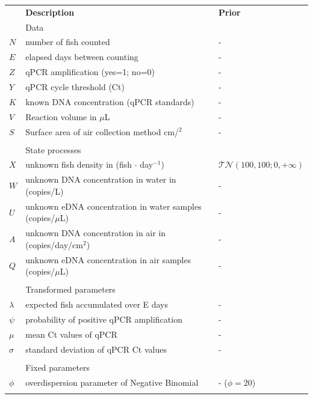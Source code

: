 \documentclass{article}
\begin{document}
\clearpage
\begin{table}
    \centering
    \begin{tabular}{lll}
         & \textbf{Description} & \textbf{Prior} \\
&Data & \\
\hline
$N$ & number of fish counted & - \\
$E$ & elapsed days between counting & - \\
$Z$ & qPCR amplification (yes=1; no=0) & - \\
$Y$ & qPCR cycle threshold (Ct) & - \\
$K$ & known DNA concentration (qPCR standards) & - \\
$V$ & Reaction volume in $\mu$L & - \\
$S$ & Surface area of air collection method cm/$^2$ & - \\

&&\\
&State processes&\\
\hline
$X$ & unknown fish density in (fish $\cdot$ day$^{-1}$) & $\mathcal{TN}(100,100;0,+\infty)$ \\
$W$ & unknown DNA concentration in water in (copies/L) & - \\
$U$&unknown eDNA concentration in water samples (copies/$\mu$L) & - \\
$A$ & unknown DNA concentration in air in (copies/day/cm$^2$) & - \\
$Q$ & unknown eDNA concentration in air samples (copies/$\mu$L) & - \\

&&\\

&Transformed parameters&\\
\hline
$\lambda$& expected fish accumulated over E days & - \\
$\psi$& probability of positive qPCR amplification & - \\
$\mu$& mean Ct values of qPCR & - \\
$\sigma$& standard deviation of qPCR Ct values & - \\
&&\\

&Fixed parameters&\\
\hline
$\phi$& overdispersion parameter of Negative Binomial & - ($\phi = 20$) \\
&&\\


\end{tabular}
\end{table}
\end{document}
